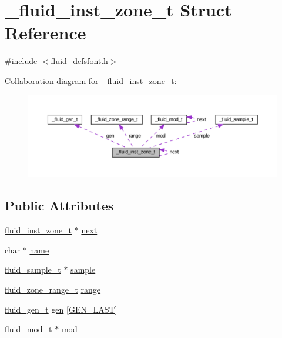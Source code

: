 \hypertarget{struct__fluid__inst__zone__t}{}\section{\+\_\+fluid\+\_\+inst\+\_\+zone\+\_\+t Struct Reference}
\label{struct__fluid__inst__zone__t}


{\ttfamily \#include $<$fluid\+\_\+defsfont.\+h$>$}



Collaboration diagram for \+\_\+fluid\+\_\+inst\+\_\+zone\+\_\+t\+:
\nopagebreak
\begin{figure}[H]
\begin{center}
\leavevmode
\includegraphics[width=350pt]{struct__fluid__inst__zone__t__coll__graph}
\end{center}
\end{figure}
\subsection*{Public Attributes}
\begin{DoxyCompactItemize}
\item 
\hyperlink{fluid__defsfont_8h_aa02ac18b4c58545cc3b297bdf4d933ab}{fluid\+\_\+inst\+\_\+zone\+\_\+t} $\ast$ \hyperlink{struct__fluid__inst__zone__t_aec824eaa2863823c9a200059cfa24c98}{next}
\item 
char $\ast$ \hyperlink{struct__fluid__inst__zone__t_aedd059777859f39c7b0d55c6213d925b}{name}
\item 
\hyperlink{types_8h_abf9174d452679ca1a4ee7d693fb773cf}{fluid\+\_\+sample\+\_\+t} $\ast$ \hyperlink{struct__fluid__inst__zone__t_a35d1af8ed2864340ded7f1115a22cbef}{sample}
\item 
\hyperlink{fluidsynth__priv_8h_ac8502f0049ba8c20821b136e611462da}{fluid\+\_\+zone\+\_\+range\+\_\+t} \hyperlink{struct__fluid__inst__zone__t_a748cbb2b5f058a6a391b27e627e85e42}{range}
\item 
\hyperlink{fluid__gen_8h_a018737d76d5ad530b622bd27b70701b0}{fluid\+\_\+gen\+\_\+t} \hyperlink{struct__fluid__inst__zone__t_af63facfbf27034a46450b2b3698b8bab}{gen} \mbox{[}\hyperlink{gen_8h_ad17a24ae3b25f3b8cc5762f818eef9b4a9c372c341b7b1a718f0016f40c615cf3}{G\+E\+N\+\_\+\+L\+A\+ST}\mbox{]}
\item 
\hyperlink{types_8h_a6c727efab500d6c0c350d4292e9aa5ef}{fluid\+\_\+mod\+\_\+t} $\ast$ \hyperlink{struct__fluid__inst__zone__t_a48594ce065f222b49680bc332c9fc2d9}{mod}
\end{DoxyCompactItemize}


